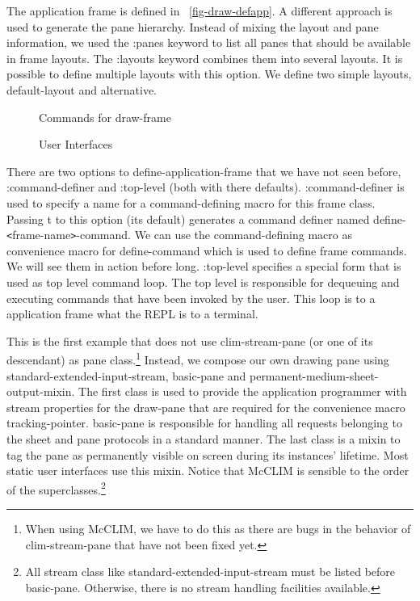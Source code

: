 \documentclass[twocolumn,a4paper]{article}
\newcommand {\code}[1]{{\sffamily #1}}
\let\class\code
\let\method\code
\let\constant\code
\let\macro\code
\let\keyword\code
\begin{document}
The application frame is defined in \figurename~\ref{fig-draw-defapp}. A different approach is used to generate the pane hierarchy. Instead of mixing the layout and pane information, we used the \keyword{:panes} keyword to list all panes that should be available in frame layouts. The \keyword{:layouts} keyword combines them into several layouts. It is possible to define multiple layouts with this option. We define two simple layouts, \code{default-layout} and \code{alternative}.


\begin{figure*}[t]
\lstset{style=framestyle}

\caption{Commands for \class{draw-frame}}\label{fig-draw-commands}
\end{figure*}


\begin{figure*}
\lstset{style=framestyle}

\caption{User Interfaces}\label{fig-draw-interfacing}
\end{figure*}

There are two options to \macro{define-application-frame} that we have not seen before, \keyword{:command-definer} and \keyword{:top-level} (both with there defaults). \keyword{:command-definer} is used to specify a name for a command-defining macro for this frame class. Passing \constant{t} to this option (its default) generates a command definer named  \macro{define-\texttt{<}frame-name\texttt{>}-command}. We can use the command-defining macro as convenience macro for \method{define-command} which is used to define frame commands. We will see them in action before long. \keyword{:top-level} specifies a special form that is used as top level command loop. The top level is responsible for dequeuing and executing commands that have been invoked by the user. This loop is to a application frame what the REPL is to a terminal.

This is the first example that does not use \class{clim-stream-pane} (or one of its descendant) as pane class.\footnote{When using McCLIM, we have to do this as there are bugs in the behavior of \class{clim-stream-pane} that have not been fixed yet.} Instead, we compose our own drawing pane using \class{standard-extended-input-stream}, \class{basic-pane} and \class{permanent-medium-sheet-output-mixin}. The first class is used to provide the application programmer with stream properties for the draw-pane that are required for the convenience macro \macro{tracking-pointer}. \class{basic-pane} is responsible for handling all requests belonging to the sheet and pane protocols in a standard manner. The last class is a mixin to tag the pane as permanently visible on screen during its instances' lifetime. Most static user interfaces use this mixin. Notice that McCLIM is sensible to the order of the superclasses.\footnote{All stream class like \class{standard-extended-input-stream} must be listed before \class{basic-pane}. Otherwise, there is no stream handling facilities available.}
\end{document}
